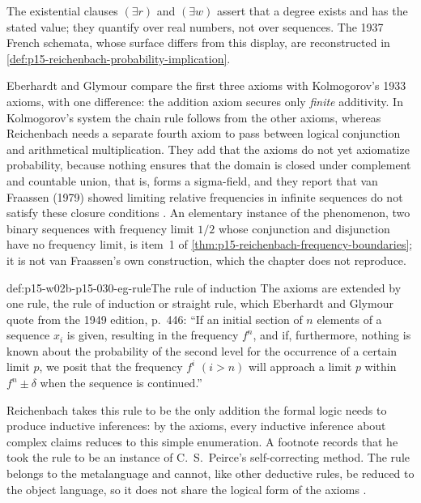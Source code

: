 The existential clauses \((\exists r)\) and \((\exists w)\) assert that a
degree exists and has the stated value; they quantify over real numbers,
not over sequences. The 1937 French schemata, whose surface differs from
this display, are reconstructed in
\cref{def:p15-reichenbach-probability-implication}.

Eberhardt and Glymour compare the first three axioms with Kolmogorov's 1933
axioms, with one difference: the addition axiom secures only
\emph{finite} additivity. In Kolmogorov's system the chain rule follows
from the other axioms, whereas Reichenbach needs a separate fourth axiom
to pass between logical conjunction and arithmetical multiplication.
They add that the axioms do not yet axiomatize probability, because
nothing ensures that the domain is closed under complement and countable
union, that is, forms a sigma-field, and they report that van Fraassen
(1979) showed limiting relative frequencies in infinite sequences do not
satisfy these closure conditions \cite[p.~371]{EberhardtGlymour2011ReichenbachReading}.
An elementary instance of the phenomenon, two binary sequences with
frequency limit \(1/2\) whose conjunction and disjunction have no
frequency limit, is item~1 of
\cref{thm:p15-reichenbach-frequency-boundaries}; it is not van Fraassen's
own construction, which the chapter does not reproduce.

\begin{hbdefinition}{def:p15-w02b-p15-030-eg-rule}{The rule of induction}
The axioms are extended by one rule, the rule of induction or straight
rule, which Eberhardt and Glymour quote from the 1949 edition, p.~446:
\enquote{If an initial section of \(n\) elements of a sequence \(x_i\) is
given, resulting in the frequency \(f^n\), and if, furthermore, nothing is
known about the probability of the second level for the occurrence of a
certain limit \(p\), we posit that the frequency \(f^i\) \((i>n)\) will
approach a limit \(p\) within \(f^n\pm\delta\) when the sequence is
continued.}
\cite[p.~371]{EberhardtGlymour2011ReichenbachReading}
\end{hbdefinition}

Reichenbach takes this rule to be the only addition the formal logic
needs to produce inductive inferences: by the axioms, every inductive
inference about complex claims reduces to this simple enumeration. A
footnote records that he took the rule to be an instance of
C.~S.~Peirce's self-correcting method. The rule belongs to the
metalanguage and cannot, like other deductive rules, be reduced to the
object language, so it does not share the logical form of the axioms
\cite[pp.~371--372 and n.~8]{EberhardtGlymour2011ReichenbachReading}.

